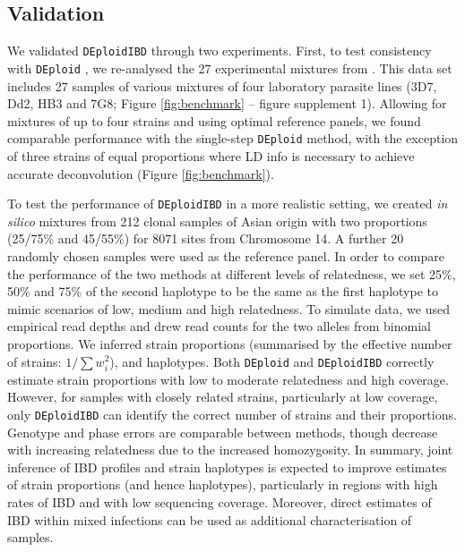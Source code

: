 \documentclass[9pt,lineno]{elife}
\begin{document}
\begin{figure}[ht]
\begin{center}
   \caption{}\label{fig:fig_unnumberd}
   \end{center}
\end{figure}


\subsection{Validation}

We validated \texttt{DEploidIBD} through two experiments.  First, to test consistency with \texttt{DEploid} \citet{Zhu2017}, we re-analysed the 27 experimental mixtures from \citep{Wendler2015}.  This data set includes 27 samples of various mixtures of four laboratory parasite lines (3D7, Dd2, HB3 and 7G8; Figure \ref{fig:benchmark} – figure supplement 1).  Allowing for mixtures of up to four strains and using optimal reference panels, we found comparable performance with the single-step \texttt{DEploid} method, with the exception of three strains of equal proportions where LD info is necessary to achieve accurate deconvolution (Figure \ref{fig:benchmark}).

To test the performance of \texttt{DEploidIBD} in a more realistic setting, we created {\it in silico} mixtures from 212 clonal samples of Asian origin with two proportions (25/75\% and 45/55\%) for 8071 sites from Chromosome 14.  A further 20 randomly chosen samples were used as the reference panel. In order to compare the performance of the two methods at different levels of relatedness, we set 25\%, 50\% and 75\% of the second haplotype to be the same as the first haplotype to mimic scenarios of low, medium and high relatedness. To simulate data, we used empirical read depths and drew read counts for the two alleles from binomial proportions.  We inferred strain proportions (summarised by the effective number of strains: $1/\sum w_{i}^{2}$), and haplotypes.  Both \texttt{DEploid} and \texttt{DEploidIBD} correctly estimate strain proportions with low to moderate relatedness and high coverage.  However, for samples with closely related strains, particularly at low coverage, only \texttt{DEploidIBD} can identify the correct number of strains and their proportions.  Genotype and phase errors are comparable between methods, though decrease with increasing relatedness due to the increased homozygosity.  In summary, joint inference of IBD profiles and strain haplotypes is expected to improve estimates of strain proportions (and hence haplotypes), particularly in regions with high rates of IBD and with low sequencing coverage.  Moreover, direct estimates of IBD within mixed infections can be used as additional characterisation of samples.
\end{document}
